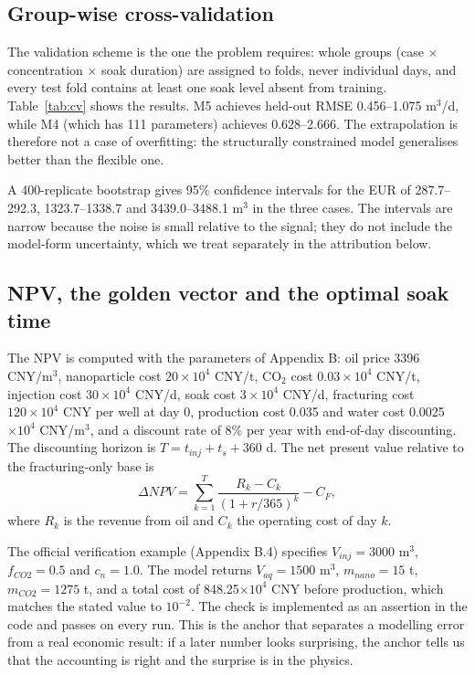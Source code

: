 \documentclass{swmcmthesis}
\begin{document}
\subsection{Group-wise cross-validation}
The validation scheme is the one the problem requires: whole groups (case $\times$ concentration $\times$ soak duration) are assigned to folds, never individual days, and every test fold contains at least one soak level absent from training. Table~\ref{tab:cv} shows the results. M5 achieves held-out RMSE 0.456--1.075 m$^3$/d, while M4 (which has 111 parameters) achieves 0.628--2.666. The extrapolation is therefore not a case of overfitting: the structurally constrained model generalises better than the flexible one.



A 400-replicate bootstrap \cite{efron} gives 95\% confidence intervals for the EUR of 287.7--292.3, 1323.7--1338.7 and 3439.0--3488.1 m$^3$ in the three cases. The intervals are narrow because the noise is small relative to the signal; they do not include the model-form uncertainty, which we treat separately in the attribution below.

\subsection{NPV, the golden vector and the optimal soak time}
The NPV is computed with the parameters of Appendix B: oil price 3396 CNY/m$^3$, nanoparticle cost $20\times10^4$ CNY/t, CO$_2$ cost $0.03\times10^4$ CNY/t, injection cost $30\times10^4$ CNY/d, soak cost $3\times10^4$ CNY/d, fracturing cost $120\times10^4$ CNY per well at day 0, production cost 0.035 and water cost 0.0025 $\times10^4$ CNY/m$^3$, and a discount rate of 8\% per year with end-of-day discounting. The discounting horizon is $T=t_{inj}+t_s+360$ d. The net present value relative to the fracturing-only base is
\begin{equation}
\Delta NPV=\sum_{k=1}^{T}\frac{R_k-C_k}{(1+r/365)^k}-C_{F},
\label{eq:npv}
\end{equation}
where $R_k$ is the revenue from oil and $C_k$ the operating cost of day $k$.

The official verification example (Appendix B.4) specifies $V_{inj}=3000$ m$^3$, $f_{CO2}=0.5$ and $c_n=1.0$. The model returns $V_{aq}=1500$ m$^3$, $m_{nano}=15$ t, $m_{CO2}=1275$ t, and a total cost of 848.25$\times10^4$ CNY before production, which matches the stated value to $10^{-2}$. The check is implemented as an assertion in the code and passes on every run. This is the anchor that separates a modelling error from a real economic result: if a later number looks surprising, the anchor tells us that the accounting is right and the surprise is in the physics.
\end{document}
